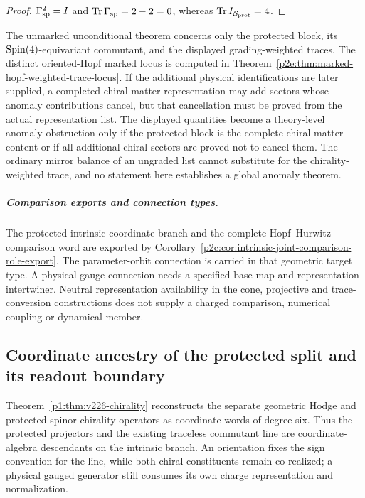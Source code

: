 \documentclass[12pt,a4paper]{article}
\begin{document}
\begin{proof}
\(\Gamma_{\rm sp}^{2}=I\) and
\(\operatorname{Tr}\Gamma_{\rm sp}=2-2=0\), whereas
\(\operatorname{Tr} I_{\mathcal S_{\rm prot}}=4\).
\end{proof}

\begin{remark}
\label{p2:rem:kin-anomaly-scope}
The unmarked unconditional theorem concerns only the protected block, its
\(\mathrm{Spin}(4)\)-equivariant commutant, and the displayed grading-weighted
traces.  The distinct oriented-Hopf marked locus is computed in
Theorem~\ref{p2e:thm:marked-hopf-weighted-trace-locus}.  If the additional
physical identifications are later supplied, a completed chiral matter
representation may add sectors whose anomaly contributions cancel, but that
cancellation must be proved from the actual representation list.  The
displayed quantities become a theory-level anomaly obstruction only if the
protected block is the complete chiral matter content or if all additional
chiral sectors are proved not to cancel them.  The
ordinary mirror balance of an ungraded list cannot substitute for the
chirality-weighted trace, and no statement here establishes a global anomaly
theorem.
\end{remark}


\subparagraph{Comparison exports and connection types.}
The protected intrinsic coordinate branch and the complete
Hopf--Hurwitz comparison word are exported by
Corollary~\ref{p2c:cor:intrinsic-joint-comparison-role-export}.
The parameter-orbit connection is carried in that geometric
target type.  A physical gauge connection needs a specified
base map and representation intertwiner.  Neutral representation
availability in the cone, projective and trace-conversion
constructions does not supply a charged comparison, numerical
coupling or dynamical member.


\subsection{Coordinate ancestry of the protected split and its readout boundary}

\label{p2e:sec:v226-protected-export}
Theorem~\ref{p1:thm:v226-chirality} reconstructs the separate geometric
Hodge and protected spinor chirality operators as coordinate words of degree
six. Thus the protected projectors and the existing traceless commutant
line are coordinate-algebra descendants on the intrinsic branch. An
orientation fixes the sign convention for the line, while both chiral
constituents remain co-realized; a physical gauged generator still consumes
its own charge representation and normalization.
\end{document}
